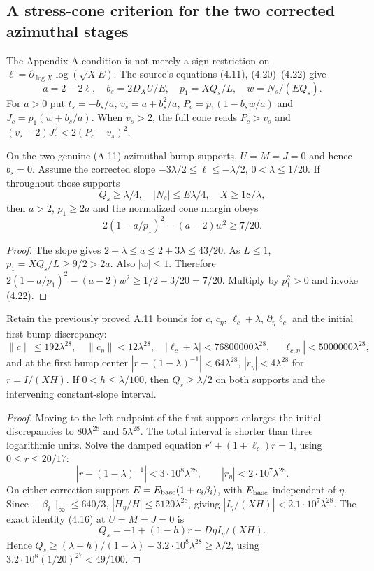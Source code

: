 \subsection*{A stress-cone criterion for the two corrected azimuthal stages}

The Appendix-A condition is not merely a sign restriction on
$\ell=\partial_{\log X}\log(\sqrt X E)$. The source's equations
(4.11), (4.20)--(4.22) give
\[
a=2-2\ell,\quad b_s=2D_XU/E,\quad
p_1=XQ_s/L,\quad w=N_s/(EQ_s).
\]
For $a>0$ put $t_s=-b_s/a$,
$v_s=a+b_s^2/a$, $P_c=p_1(1-b_sw/a)$ and
$J_c=p_1(w+b_s/a)$. When $v_s>2$, the full cone reads
$P_c>v_s$ and $(v_s-2)J_c^2<2(P_c-v_s)^2$.

\begin{proposition}
\label{prop:A11-cone-source}
On the two genuine (A.11) azimuthal-bump supports,
$U=M=J=0$ and hence $b_s=0$. Assume the corrected slope
$-3\lambda/2\le\ell\le-\lambda/2$, $0<\lambda\le1/20$.
If throughout those supports
\[
Q_s\ge\lambda/4,\quad |N_s|\le E\lambda/4,
\quad X\ge18/\lambda,
\]
then $a>2$, $p_1\ge2a$ and the normalized cone margin obeys
\[
2(1-a/p_1)^2-(a-2)w^2\ge7/20.
\]
\end{proposition}
\begin{proof}
The slope gives $2+\lambda\le a\le2+3\lambda\le43/20$.
As $L\le1$, $p_1=XQ_s/L\ge9/2>2a$.
Also $|w|\le1$. Therefore
$2(1-a/p_1)^2-(a-2)w^2\ge1/2-3/20=7/20$.
Multiply by $p_1^2>0$ and invoke (4.22).
\end{proof}

\begin{proposition}
\label{prop:A11-cone-Qs}
Retain the previously proved A.11 bounds for $c$, $c_\eta$,
$\ell_c+\lambda$, $\partial_\eta\ell_c$ and the initial
first-bump discrepancy:
\[
\|c\|\le192\lambda^{28},\quad
\|c_\eta\|<12\lambda^{28},\quad
|\ell_c+\lambda|<76800000\lambda^{28},\quad
|\ell_{c,\eta}|<5000000\lambda^{28},
\]
and at the first bump center
$|r-(1-\lambda)^{-1}|<64\lambda^{28}$,
$|r_\eta|<4\lambda^{28}$ for $r=I/(XH)$.
If $0<h\le\lambda/100$, then $Q_s\ge\lambda/2$ on both
supports and the intervening constant-slope interval.
\end{proposition}
\begin{proof}
Moving to the left endpoint of the first support enlarges
the initial discrepancies to $80\lambda^{28}$ and
$5\lambda^{28}$. The total interval is shorter than three
logarithmic units. Solve the damped equation
$r'+(1+\ell_c)r=1$, using $0\le r\le20/17$:
\[
|r-(1-\lambda)^{-1}|<3\cdot10^8\lambda^{28},
\qquad |r_\eta|<2\cdot10^7\lambda^{28}.
\]
On either correction support $E=E_{\rm base}(1+c_i\beta_i)$,
with $E_{\rm base}$ independent of $\eta$.
Since $\|\beta_i\|_\infty\le640/3$,
$|H_\eta/H|\le5120\lambda^{28}$, giving
$|I_\eta/(XH)|<2.1\cdot10^7\lambda^{28}$.
The exact identity (4.16) at $U=M=J=0$ is
\[
Q_s=-1+(1-h)r-D\eta I_\eta/(XH).
\]
Hence $Q_s\ge(\lambda-h)/(1-\lambda)-
3.2\cdot10^8\lambda^{28}\ge\lambda/2$, using
$3.2\cdot10^8(1/20)^{27}<49/100$.
\end{proof}

